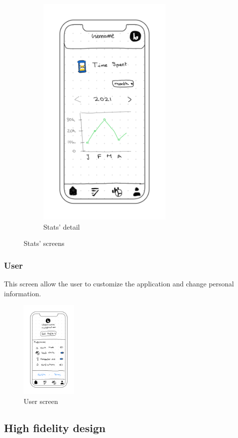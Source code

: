 \begin{figure}[H]
\begin{subfigure}[T]{0.32\textwidth}
        \includegraphics[width=0.72\textwidth]{assets/screens/stats/Stats - 3.png}
        \caption{Stats' detail}
        \label{fig:design_screen_stats_3}
    \end{subfigure}
       \caption{Stats' screens}
       \label{fig:design_screen_stats}
\end{figure}

\subsubsection{User}
This screen allow the user to customize the application and change personal information. \\
\begin{figure}[H]
    \centering
        \includegraphics[width=0.24\textwidth]{assets/screens/User.png}
    \caption{User screen}
    \label{fig:design_user}
\end{figure}



\subsection{High fidelity design}

